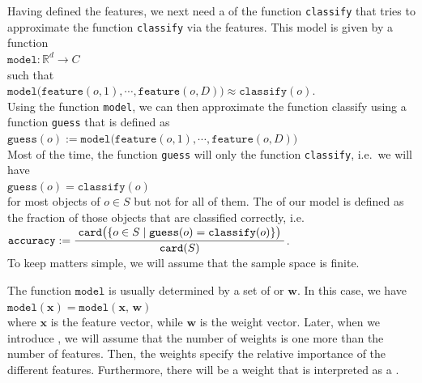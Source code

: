 Having defined the features, we next need a  of the function \texttt{classify} that tries to approximate the
function \texttt{classify} via the features.  This model is given by a function
\\[0.2cm]
\hspace*{1.3cm}
$\mathtt{model}: \mathbb{R}^d \rightarrow C$
\\[0.2cm]
such that
\\[0.2cm]
\hspace*{1.3cm}
$\mathtt{model}\bigl(\mathtt{feature}(o,1), \cdots, \mathtt{feature}(o,D)\bigr) \approx \mathtt{classify}(o)$.
\\[0.2cm]
Using the function \texttt{model}, we can then approximate the function classify using a function \texttt{guess} that is
defined as
\\[0.2cm]
\hspace*{1.3cm}
$\mathtt{guess}(o) := \mathtt{model}\bigl(\mathtt{feature}(o,1), \cdots, \mathtt{feature}(o,D)\bigr)$
\\[0.2cm]
Most of the time, the function \texttt{guess} will only  the function \texttt{classify}, i.e.~we will have
\\[0.2cm]
\hspace*{1.3cm}
$\mathtt{guess}(o) = \mathtt{classify}(o)$
\\[0.2cm]
for most objects of $o \in S$ but not for all of them.  The   of our model is
defined as the fraction of those objects that are classified correctly, i.e.~
\\[0.2cm]
\hspace*{1.3cm}
$\displaystyle \mathtt{accuracy} := \frac{\;\mathtt{card}\bigl( \{ o \in S \mid \mathtt{guess}(o) = \mathtt{classify}(o)\}\bigr)\;}{\mathtt{card}(S)}$.
\\[0.2cm]
To keep matters simple, we will assume that the sample space is finite.

The function $\mathtt{model}$ is usually determined by a set of  or  $\mathbf{w}$. In
this case, we have
\\[0.2cm]
\hspace*{1.3cm}
$\mathtt{model}(\mathbf{x}) = \mathtt{model}(\mathbf{x},\,\mathbf{w})$
\\[0.2cm]
where $\mathbf{x}$ is the feature vector, while $\mathbf{w}$ is the weight vector.  Later, when we
introduce , we will assume that the number of weights is one more than the number of
features.  Then, the weights specify the relative importance of the different features. Furthermore, there will
be a weight that is interpreted as a . 

